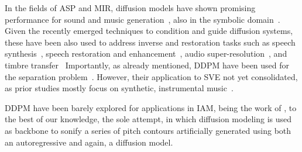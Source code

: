 In the fields of \acrshort{ASP} and \acrshort{MIR}, diffusion models have shown promising performance for sound and music generation~\citep{liu-audioldm,schneider-mousai,evans-fast_ldm}, also in the symbolic domain~\citep{mittal-diffusion_symbolic}.
%
Given the recently emerged techniques to condition and guide diffusion systems, these have been also used to address inverse and restoration tasks such as speech synthesis~\citep{kong-diffwave,chen-wavegrad,liu-diffsinger}, speech restoration and enhancement~\citep{ho-diffusion,zhang-diffusion_restoring,lu-diffusion_speech_enhancement_2,lu-diffusion_speech_enhancement_1,serra-universe}, audio super-resolution~\citep{lee-diffusion_upsampling}, and timbre transfer~\citep{baoueb-wavetransfer}
%
Importantly, as already mentioned, \acrshort{DDPM} have been used for the separation problem~\citep{scheibler-diffusion_speech,yu-zeroshot,mariani-msdm,karchkhadze-msdm_ldm}. %
However, their application to \acrshort{SVE} not yet consolidated, as prior studies mostly focus on synthetic, instrumental music~\citep{manilow-slakh}.


\acrshort{DDPM} have been barely explored for applications in \acrshort{IAM}, being the work of \citep{shikarpur-hierarchical}, to the best of our knowledge, the sole attempt, in which diffusion modeling is used as backbone to sonify a series of pitch contours artificially generated using both an autoregressive and again, a diffusion model. 